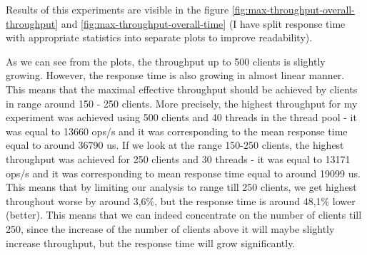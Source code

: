 \documentclass[11pt]{article}
\begin{document}
Results of this experiments are visible in the figure \ref{fig:max-throughput-overall-throughput} and \ref{fig:max-throughput-overall-time} (I have split response time with appropriate statistics into separate plots to improve readability).

As we can see from the plots, the throughput up to 500 clients is slightly growing. However, the response time is also growing in almost linear manner. This means that the maximal effective throughput should be achieved by clients in range around 150 - 250 clients. More precisely, the highest throughput for my experiment was achieved using 500 clients and 40 threads in the thread pool - it was equal to 13660 ops/s and it was corresponding to the mean response time equal to around 36790 us. If we look at the range 150-250 clients, the highest throughput was achieved for 250 clients and 30 threads - it was equal to 13171 ops/s and it was corresponding to mean response time equal to around 19099 us. This means that by limiting our analysis to range till 250 clients, we get highest throughout worse by around 3,6\%, but the response time is around 48,1\% lower (better). This means that we can indeed concentrate on the number of clients till 250, since the increase of the number of clients above it will maybe slightly increase throughput, but the response time will grow significantly.

\end{document}
